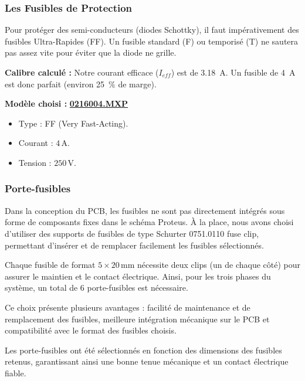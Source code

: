         \subsubsection{Les Fusibles de Protection}
        Pour protéger des semi-conducteurs (diodes Schottky), il faut impérativement des fusibles Ultra-Rapides (FF). Un fusible standard (F) ou temporisé (T) ne sautera pas assez vite pour éviter que la diode ne grille.

        \textbf{Calibre calculé :} Notre courant efficace ($I_{eff}$) est de \SI{3.18}{\ampere}. Un fusible de \SI{4}{\ampere} est donc parfait (environ \SI{25}{\percent} de marge).

        \textbf{Modèle choisi :} \href{https://fr.farnell.com/littelfuse/0216004-mxp/fusible-cartouche-act-rapide-4a/dp/1354546?srsltid=AfmBOornsAkjT_Xk2D6B0Ly6WX-joAbwvfaGCFQaKP9l-Uf8rfNmzPOX}{\textbf{0216004.MXP}}
        \begin{itemize}
            \item Type : FF (Very Fast-Acting).
            \item Courant : $4 \, \text{A}$.
            \item Tension : $250 \, \text{V}$.
        \end{itemize}

        \subsubsection{Porte-fusibles}
        Dans la conception du PCB, les fusibles ne sont pas directement intégrés sous forme de composants fixes dans le schéma Proteus. À la place, nous avons choisi d'utiliser des supports de fusibles de type Schurter 0751.0110 fuse clip, permettant d'insérer et de remplacer facilement les fusibles sélectionnés.

        Chaque fusible de format $5\times20 \, \text{mm}$ nécessite deux clips (un de chaque côté) pour assurer le maintien et le contact électrique. Ainsi, pour les trois phases du système, un total de 6 porte-fusibles est nécessaire.

        Ce choix présente plusieurs avantages : facilité de maintenance et de remplacement des fusibles, meilleure intégration mécanique sur le PCB et compatibilité avec le format des fusibles choisis.

        Les porte-fusibles ont été sélectionnés en fonction des dimensions des fusibles retenus, garantissant ainsi une bonne tenue mécanique et un contact électrique fiable.

